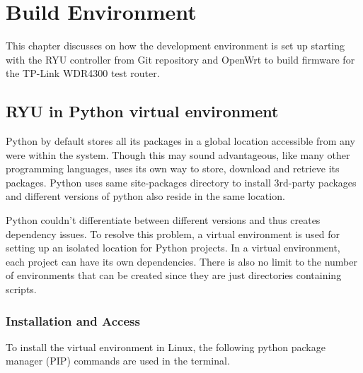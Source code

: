 \chapter{Build Environment} \label{ch:build_environment}
This chapter discusses on how the development environment is set up starting with the RYU controller from Git repository and OpenWrt to build firmware for the TP-Link WDR4300 test router.
\section{RYU in Python virtual environment \cite{Install_virtualenv}} \label{virtualenv}
Python by default stores all its packages in a global location accessible from any were within the system. Though this may sound advantageous, like many other programming languages, uses its own way to store, download and retrieve its packages. Python uses same site-packages directory to install 3rd-party packages and different versions of python also reside in the same location. 

Python couldn’t differentiate between different versions and thus creates dependency issues. To resolve this problem, a virtual environment is used for setting up an isolated location for Python projects. In a virtual environment, each project can have its own dependencies. There is also no limit to the number of environments that can be created since they are just directories containing scripts. 

\subsection{Installation and Access \cite{Install_virtualenv} \cite{Install_RyuSDN}} \label{RYU_install}

To install the virtual environment in Linux, the following python package manager (PIP) commands are used in the terminal.


